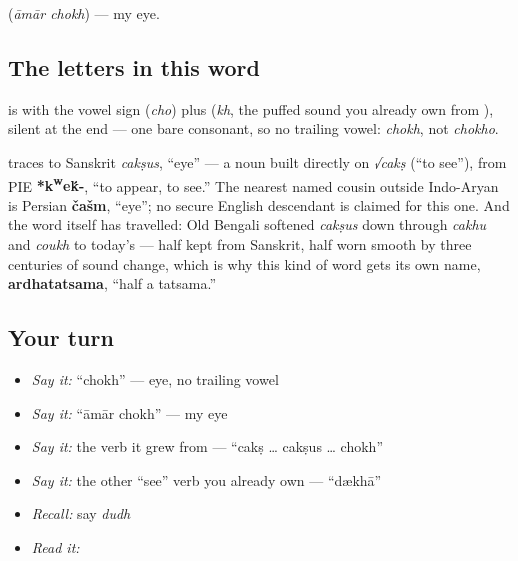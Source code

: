 \textbf{ } (\emph{āmār chokh}) — my eye.

\subsection*{The letters in this word}
\textbf{} is \textbf{} with the vowel sign \textbf{} (\emph{cho}) plus \textbf{} (\emph{kh}, the puffed sound you already own from ), silent at the end — one bare consonant, so no trailing vowel: \emph{chokh}, not \emph{chokho}.

\begin{cousinweb}
\textbf{} traces to Sanskrit \emph{cakṣus}, \textquotedblleft{}eye\textquotedblright{} — a noun built directly on \emph{√cakṣ} (\textquotedblleft{}to see\textquotedblright{}), from PIE \textbf{*k\textsuperscript{w}e\'{k}-}, \textquotedblleft{}to appear, to see.\textquotedblright{} The nearest named cousin outside Indo-Aryan is Persian \textbf{čašm}, \textquotedblleft{}eye\textquotedblright{}; no secure English descendant is claimed for this one. And the word itself has travelled: Old Bengali softened \emph{cakṣus} down through \emph{cakhu} and \emph{coukh} to today's \textbf{} — half kept from Sanskrit, half worn smooth by three centuries of sound change, which is why this kind of word gets its own name, \textbf{ardhatatsama}, \textquotedblleft{}half a tatsama.\textquotedblright{}
\end{cousinweb}

\subsection*{Your turn}
\begin{itemize}
\raggedright
  \item \emph{Say it:} \textquotedblleft{}chokh\textquotedblright{} — eye, no trailing vowel
  \item \emph{Say it:} \textquotedblleft{}āmār chokh\textquotedblright{} — my eye
  \item \emph{Say it:} the verb it grew from — \textquotedblleft{}cakṣ … cakṣus … chokh\textquotedblright{}
  \item \emph{Say it:} the other \textquotedblleft{}see\textquotedblright{} verb you already own — \textquotedblleft{}dækhā\textquotedblright{}
  \item \emph{Recall:} say \emph{dudh}
  \item \emph{Read it:} \textbf{}
\end{itemize}

